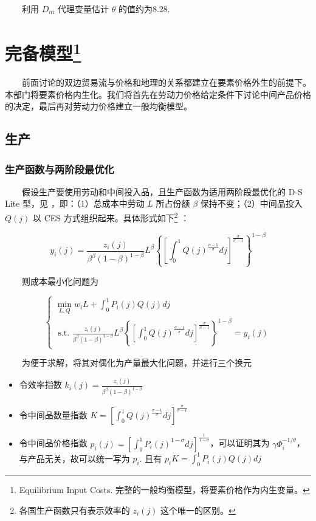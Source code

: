 \documentclass[]{article}
\providecommand{\tightlist}{%
  \setlength{\itemsep}{0pt}\setlength{\parskip}{0pt}}
\let\rmarkdownfootnote\footnote%
\def\footnote{\protect\rmarkdownfootnote}
\begin{document}
　　利用 \(D_{ni}\) 代理变量估计 \(\theta\) 的值约为8.28.

\hypertarget{section-13}{%
\section[完备模型]{\texorpdfstring{完备模型\footnote{Equilibrium Input Costs. 完整的一般均衡模型，将要素价格作为内生变量。}}{完备模型}}\label{section-13}}

　　前面讨论的双边贸易流与价格和地理的关系都建立在要素价格外生的前提下。本部门将要素价格内生化。我们将首先在劳动力价格给定条件下讨论中间产品价格的决定，最后再对劳动力价格建立一般均衡模型。

\hypertarget{section-14}{%
\subsection{生产}\label{section-14}}

\hypertarget{section-15}{%
\subsubsection{生产函数与两阶段最优化}\label{section-15}}

　　假设生产要使用劳动和中间投入品，且生产函数为适用两阶段最优化的 D-S Lite 型，见 \citet{DS1977} ，即：（1）总成本中劳动 \(L\) 所占份额 \(\beta\) 保持不变；（2）中间品投入 \(Q(j)\) 以 CES 方式组织起来。具体形式如下\footnote{各国生产函数只有表示效率的 \(z_i(j)\) 这个唯一的区别。} ：

\[
y_{i}(j)=\frac{z_{i}(j)}{\beta^{\beta}(1-\beta)^{1-\beta}} L^{\beta}\left\{\left[\int_{0}^{1} Q(j)^{\frac{\sigma-1}{\sigma}} d j\right]^{\frac{\sigma}{\sigma-1}}\right\}^{1-\beta}
\]

　　则成本最小化问题为

\[
\left\{\begin{array}{c}
{\min_{L, Q} w_{i}L + \int_{0}^{1} P_{i}(j)Q(j) d j} \\ {\text { s.t. }\frac{z_{i}(j)}{\beta^{\beta}(1-\beta)^{1-\beta}} L^{\beta}\left\{\left[\int_{0}^{1} Q(j)^{\frac{\sigma-1}{\sigma}} d j\right]^{\frac{\sigma}{\sigma-1}}\right\}^{1-\beta}=y_{i}(j)}
\end{array}\right.
\]

　　为便于求解，将其对偶化为产量最大化问题，并进行三个换元

\begin{itemize}
\tightlist
\item
  令效率指数 \(k_{i}(j)=\frac{z_{i}(j)}{\beta^{\beta}(1-\beta)^{1-\beta}}\)
\item
  令中间品数量指数 \(K=\left[\int_{0}^{1} Q(j)^{\frac{\sigma-1}{\sigma}} d j\right]^{\frac{\sigma}{\sigma-1}}\)
\item
  令中间品价格指数 \(p_{i}(j)=\left[\int_{0}^{1} P_{i}(j)^{1-\sigma} d j\right]^{\frac{1}{1-\sigma}}\)，可以证明其为 \(\gamma \Phi_{i}^{-1 / \theta}\)，与产品无关，故可以统一写为 \(p_{i}\). 且有 \(p_{i}K=\int_{0}^{1} P_{i}(j)Q(j) d j\)
\end{itemize}
\end{document}
